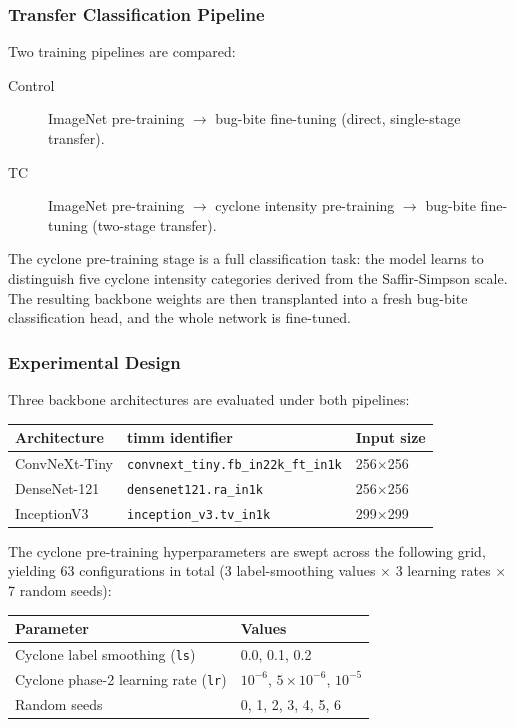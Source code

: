\documentclass[12pt,a4paper]{article}
\begin{document}
\subsubsection{Transfer Classification Pipeline}

Two training pipelines are compared:

\begin{description}
    \item[Control] ImageNet pre-training $\rightarrow$ bug-bite fine-tuning
          (direct, single-stage transfer).
    \item[TC] ImageNet pre-training $\rightarrow$ cyclone intensity pre-training
          $\rightarrow$ bug-bite fine-tuning (two-stage transfer).
\end{description}

The cyclone pre-training stage is a full classification task: the model learns to
distinguish five cyclone intensity categories derived from the Saffir-Simpson
scale. The resulting backbone weights are then transplanted into a fresh
bug-bite classification head, and the whole network is fine-tuned.

\subsubsection{Experimental Design}

Three backbone architectures are evaluated under both pipelines:

\begin{center}
\begin{tabular}{lll}
\toprule
\textbf{Architecture} & \textbf{timm identifier} & \textbf{Input size} \\
\midrule
ConvNeXt-Tiny  & \texttt{convnext\_tiny.fb\_in22k\_ft\_in1k} & 256$\times$256 \\
DenseNet-121   & \texttt{densenet121.ra\_in1k}                & 256$\times$256 \\
InceptionV3    & \texttt{inception\_v3.tv\_in1k}              & 299$\times$299 \\
\bottomrule
\end{tabular}
\end{center}

The cyclone pre-training hyperparameters are swept across the following grid,
yielding 63 configurations in total (3 label-smoothing values $\times$ 3 learning
rates $\times$ 7 random seeds):

\begin{center}
\begin{tabular}{ll}
\toprule
\textbf{Parameter} & \textbf{Values} \\
\midrule
Cyclone label smoothing (\texttt{ls}) & 0.0, 0.1, 0.2 \\
Cyclone phase-2 learning rate (\texttt{lr}) & $10^{-6}$, $5\times10^{-6}$, $10^{-5}$ \\
Random seeds & 0, 1, 2, 3, 4, 5, 6 \\
\bottomrule
\end{tabular}
\end{center}
\end{document}
